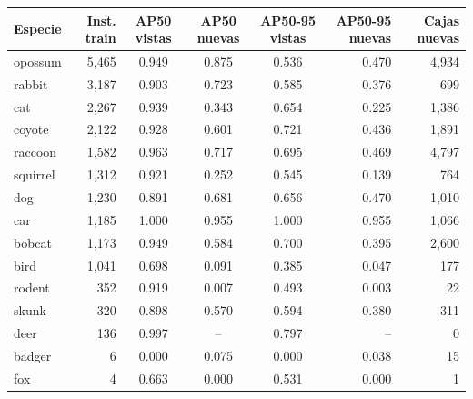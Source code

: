 \begin{tabular}{lrcccrr}
\hline
Especie & Inst. train & AP50 vistas & AP50 nuevas & AP50-95 vistas & AP50-95 nuevas & Cajas nuevas \\
\hline
opossum & 5,465 & 0.949 & 0.875 & 0.536 & 0.470 & 4,934 \\
rabbit & 3,187 & 0.903 & 0.723 & 0.585 & 0.376 & 699 \\
cat & 2,267 & 0.939 & 0.343 & 0.654 & 0.225 & 1,386 \\
coyote & 2,122 & 0.928 & 0.601 & 0.721 & 0.436 & 1,891 \\
raccoon & 1,582 & 0.963 & 0.717 & 0.695 & 0.469 & 4,797 \\
squirrel & 1,312 & 0.921 & 0.252 & 0.545 & 0.139 & 764 \\
dog & 1,230 & 0.891 & 0.681 & 0.656 & 0.470 & 1,010 \\
car & 1,185 & 1.000 & 0.955 & 1.000 & 0.955 & 1,066 \\
bobcat & 1,173 & 0.949 & 0.584 & 0.700 & 0.395 & 2,600 \\
bird & 1,041 & 0.698 & 0.091 & 0.385 & 0.047 & 177 \\
rodent & 352 & 0.919 & 0.007 & 0.493 & 0.003 & 22 \\
skunk & 320 & 0.898 & 0.570 & 0.594 & 0.380 & 311 \\
deer & 136 & 0.997 & -- & 0.797 & -- & 0 \\
badger & 6 & 0.000 & 0.075 & 0.000 & 0.038 & 15 \\
fox & 4 & 0.663 & 0.000 & 0.531 & 0.000 & 1 \\
\hline
\end{tabular}
